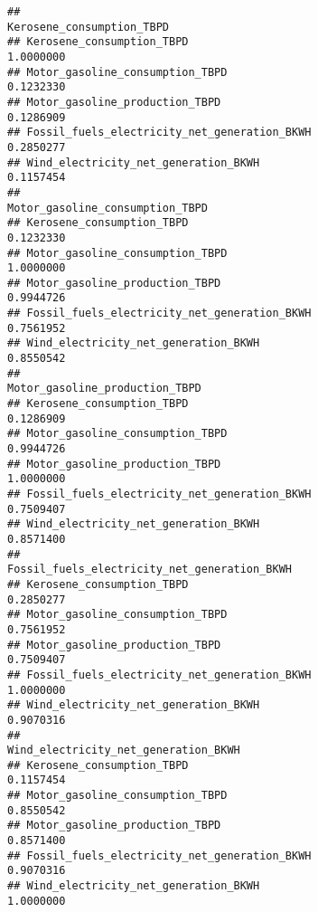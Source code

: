 \documentclass[
]{article}
\begin{document}
\begin{verbatim}
##                                              Kerosene_consumption_TBPD
## Kerosene_consumption_TBPD                                    1.0000000
## Motor_gasoline_consumption_TBPD                              0.1232330
## Motor_gasoline_production_TBPD                               0.1286909
## Fossil_fuels_electricity_net_generation_BKWH                 0.2850277
## Wind_electricity_net_generation_BKWH                         0.1157454
##                                              Motor_gasoline_consumption_TBPD
## Kerosene_consumption_TBPD                                          0.1232330
## Motor_gasoline_consumption_TBPD                                    1.0000000
## Motor_gasoline_production_TBPD                                     0.9944726
## Fossil_fuels_electricity_net_generation_BKWH                       0.7561952
## Wind_electricity_net_generation_BKWH                               0.8550542
##                                              Motor_gasoline_production_TBPD
## Kerosene_consumption_TBPD                                         0.1286909
## Motor_gasoline_consumption_TBPD                                   0.9944726
## Motor_gasoline_production_TBPD                                    1.0000000
## Fossil_fuels_electricity_net_generation_BKWH                      0.7509407
## Wind_electricity_net_generation_BKWH                              0.8571400
##                                              Fossil_fuels_electricity_net_generation_BKWH
## Kerosene_consumption_TBPD                                                       0.2850277
## Motor_gasoline_consumption_TBPD                                                 0.7561952
## Motor_gasoline_production_TBPD                                                  0.7509407
## Fossil_fuels_electricity_net_generation_BKWH                                    1.0000000
## Wind_electricity_net_generation_BKWH                                            0.9070316
##                                              Wind_electricity_net_generation_BKWH
## Kerosene_consumption_TBPD                                               0.1157454
## Motor_gasoline_consumption_TBPD                                         0.8550542
## Motor_gasoline_production_TBPD                                          0.8571400
## Fossil_fuels_electricity_net_generation_BKWH                            0.9070316
## Wind_electricity_net_generation_BKWH                                    1.0000000
\end{verbatim}
\end{document}
